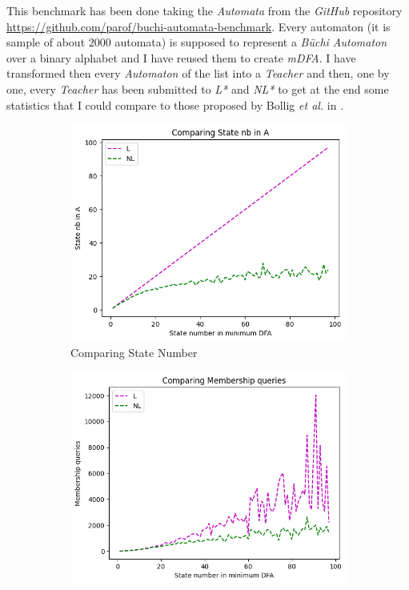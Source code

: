 This benchmark has been done taking the \textit{Automata} from the \textit{GitHub} repository \url{https://github.com/parof/buchi-automata-benchmark}. Every automaton (it is sample of about $2000$ automata) is supposed to represent a \textit{Büchi Automaton} over a binary alphabet and I have reused them to create \textit{mDFA}. I have transformed then every \textit{Automaton} of the list into a \textit{Teacher} and then, one by one, every \textit{Teacher} has been submitted to \textit{L*} and \textit{NL*} to get at the end some statistics that I could compare to those proposed by Bollig \textit{et al.} in \cite{NLPaper}.

\begin{figure}[!htb]
  \centering
  \begin{subfigure}[b]{0.3\textwidth}
    \includegraphics[width=\textwidth]{../statistics/plots/BenchMark/State nb in A.png}
    \caption{Comparing State Number}
    \label{fig:StateBenchMarkCompare}
  \end{subfigure}
  \begin{subfigure}[b]{0.3\textwidth}
    \includegraphics[width=\textwidth]{../statistics/plots/BenchMark/Membership queries.png}

\end{subfigure}
\end{figure}
